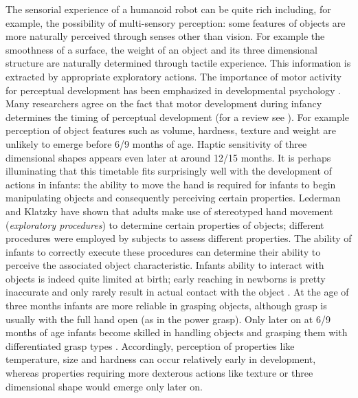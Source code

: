 The sensorial experience of a humanoid robot can be quite rich including, for example, the possibility of multi-sensory perception: some features of objects are more naturally perceived through senses other than vision. For example the smoothness of a surface, the weight of an object and its three dimensional structure are naturally determined through tactile experience. This information is extracted by appropriate exploratory actions.
The importance of motor activity for perceptual development has been emphasized in developmental psychology \cite{hofsten04motor,gibson88explore}. Many researchers agree on the fact that motor development during infancy determines the timing of perceptual development (for a review see \cite{bushnell93motor}). For example perception of object features such as volume, hardness, texture and weight are unlikely to emerge before 6/9 months of age. Haptic sensitivity of three dimensional shapes appears even later at around 12/15 months. It is perhaps illuminating that this timetable fits surprisingly well with the development of actions in infants: the ability to move the hand is required for infants to begin manipulating objects and consequently perceiving certain properties. Lederman and Klatzky \cite{lederman87hand} have shown that adults make use of stereotyped hand movement (\emph{exploratory procedures}) to determine certain properties of objects; different procedures were employed by subjects to assess different properties. The ability of infants to correctly execute these procedures can determine their ability to perceive the associated object characteristic. Infants ability to interact with objects is indeed quite limited at birth; early reaching in newborns is pretty inaccurate and only rarely result in actual contact with the object \cite{hofsten82eye-hand}. At the age of three months infants are more reliable in grasping objects, although grasp is usually with the full hand open (as in the power grasp). Only later on at 6/9 months of age infants become skilled in handling objects and grasping them with differentiated grasp types \cite{hofsten93thestructuring}. Accordingly, perception of properties like temperature, size and hardness can occur relatively early in development, whereas properties requiring more dexterous actions like texture or three dimensional shape would emerge only later on.

